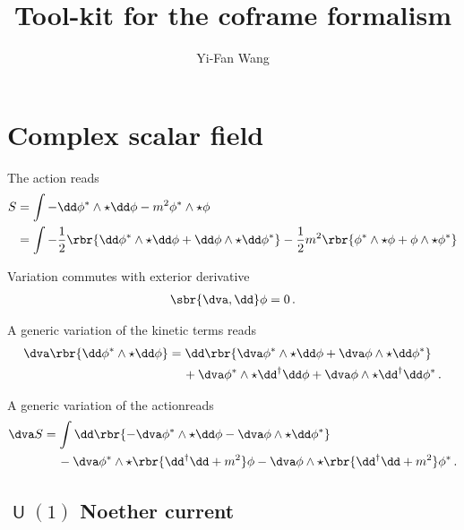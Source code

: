 \documentclass[a4paper]{article}
\title{Tool-kit for the coframe formalism}
\author{Yi-Fan Wang}
\begin{document}
\maketitle


\tableofcontents

\section{Complex scalar field}


The action reads
\begin{align}
S &= \int -\dd\phi^*\wedge\star\dd\phi - m^2 \phi^*\wedge\star\phi
\\
&= \int -\frac{1}{2}\rbr{\dd\phi^*\wedge\star\dd\phi 
		+ \dd\phi\wedge\star\dd\phi^*}
		- \frac{1}{2} m^2 \rbr{\phi^*\wedge\star\phi
		+ \phi\wedge\star\phi^*}
\end{align}

Variation commutes with exterior derivative
\begin{align}
\sbr{\dva, \dd}\phi = 0\,.
\end{align}

A generic variation of the kinetic terms reads
\begin{align}
\begin{split}
\dva \rbr{\dd \phi^*\wedge\star\dd\phi} &= 
\dd\rbr{\dva\phi^*\wedge\star\dd\phi + \dva\phi\wedge\star\dd\phi^*}
\\
&\quad\,+
\dva\phi^*\wedge\star\dd^{\dagger}\dd\phi +
\dva\phi\wedge\star\dd^{\dagger}\dd\phi^*\,.
\end{split}
\end{align}

A generic variation of the actionreads
\begin{align}
\dva S &=
\int \dd\rbr{-\dva\phi^*\wedge\star\dd\phi -
\dva\phi\wedge\star\dd\phi^*}
\nonumber \\
&\quad\,-
\dva\phi^*\wedge\star\rbr{\dd^{\dagger}\dd+m^2}\phi -
\dva\phi\wedge\star\rbr{\dd^{\dagger}\dd+m^2}\phi^*\,.
\end{align}

\subsection[$U(1)$ Noether current]{$\msansU(1)$ Noether current}
\end{document}
